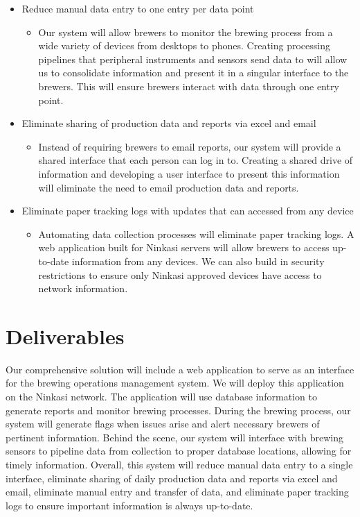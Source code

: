 \documentclass[draftclsnofoot,onecolumn,letterpaper,10pt]{IEEEtran}
\begin{document}
\begin{itemize}

		\item {Reduce manual data entry to one entry per data point}
			\begin{itemize}
			\item {Our system will allow brewers to monitor the brewing process from a wide variety of devices from desktops to phones. Creating processing pipelines that peripheral instruments and sensors send data to will allow us to consolidate information and present it in a singular interface to the brewers. This will ensure brewers interact with data through one entry point.}
			\end{itemize}


	\item {Eliminate sharing of production data and reports via excel and email}
	    \begin{itemize}
			\item {Instead of requiring brewers to email reports, our system will provide a shared interface that each person can log in to. Creating a shared drive of information and developing a user interface to present this information will eliminate the need to email production data and reports.}
			\end{itemize}


	\item {Eliminate paper tracking logs with updates that can accessed from any device}
	    \begin{itemize}
			\item {Automating data collection processes will eliminate paper tracking logs. A web application built for Ninkasi servers will allow brewers to access up-to-date information from any devices. We can also build in security restrictions to ensure only Ninkasi approved devices have access to network information.}
			\end{itemize}

\end{itemize}

\section{\textbf{Deliverables}}
Our comprehensive solution will include a web application to serve as an interface for the brewing operations management system. We will deploy this application on the Ninkasi network. The application will use database information to generate reports and monitor brewing processes. During the brewing process, our system will generate flags when issues arise and alert necessary brewers of pertinent information. Behind the scene, our system will interface with brewing sensors to pipeline data from collection to proper database locations, allowing for timely information. Overall, this system will reduce manual data entry to a single interface, eliminate sharing of daily production data and reports via excel and email, eliminate manual entry and transfer of data, and eliminate paper tracking logs to ensure important information is always up-to-date.
\end{document}
